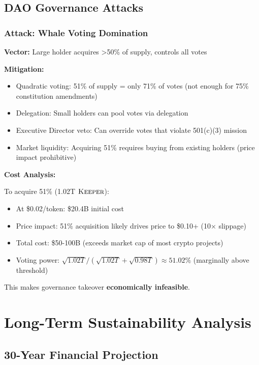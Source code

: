 \documentclass[11pt,letterpaper]{article}
\theoremstyle{definition}
\theoremstyle{remark}
\newcommand{\KEEPER}{\textsc{Keeper}}
\begin{document}
\subsection{DAO Governance Attacks}

\subsubsection{Attack: Whale Voting Domination}

\textbf{Vector:} Large holder acquires >50\% of supply, controls all votes

\textbf{Mitigation:}
\begin{itemize}
\item Quadratic voting: 51\% of supply = only 71\% of votes (not enough for 75\% constitution amendments)
\item Delegation: Small holders can pool votes via delegation
\item Executive Director veto: Can override votes that violate 501(c)(3) mission
\item Market liquidity: Acquiring 51\% requires buying from existing holders (price impact prohibitive)
\end{itemize}

\textbf{Cost Analysis:}

To acquire 51\% (1.02T $\KEEPER$):
\begin{itemize}
\item At \$0.02/token: \$20.4B initial cost
\item Price impact: 51\% acquisition likely drives price to \$0.10+ (10× slippage)
\item Total cost: \$50-100B (exceeds market cap of most crypto projects)
\item Voting power: $\sqrt{1.02T} / (\sqrt{1.02T} + \sqrt{0.98T}) \approx 51.02\%$ (marginally above threshold)
\end{itemize}

This makes governance takeover \textbf{economically infeasible}.

\section{Long-Term Sustainability Analysis}

\subsection{30-Year Financial Projection}
\end{document}
